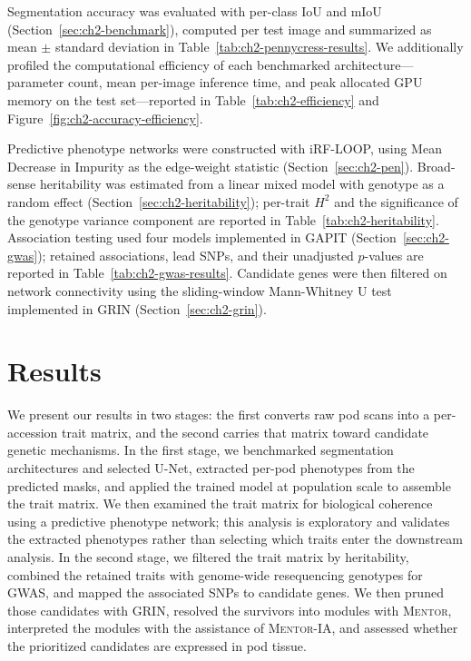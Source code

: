 Segmentation accuracy was evaluated with per-class IoU and mIoU (Section~\ref{sec:ch2-benchmark}), computed per test image and summarized as mean $\pm$ standard deviation in Table~\ref{tab:ch2-pennycress-results}. We additionally profiled the computational efficiency of each benchmarked architecture---parameter count, mean per-image inference time, and peak allocated GPU memory on the test set---reported in Table~\ref{tab:ch2-efficiency} and Figure~\ref{fig:ch2-accuracy-efficiency}.

Predictive phenotype networks were constructed with iRF-LOOP, using Mean Decrease in Impurity as the edge-weight statistic (Section~\ref{sec:ch2-pen}). Broad-sense heritability was estimated from a linear mixed model with genotype as a random effect (Section~\ref{sec:ch2-heritability}); per-trait $H^2$ and the significance of the genotype variance component are reported in Table~\ref{tab:ch2-heritability}. Association testing used four models implemented in GAPIT (Section~\ref{sec:ch2-gwas}); retained associations, lead SNPs, and their unadjusted $p$-values are reported in Table~\ref{tab:ch2-gwas-results}. Candidate genes were then filtered on network connectivity using the sliding-window Mann-Whitney U test implemented in GRIN (Section~\ref{sec:ch2-grin}).

\section{Results}
We present our results in two stages: the first converts raw pod scans into a per-accession trait matrix, and the second carries that matrix toward candidate genetic mechanisms. In the first stage, we benchmarked segmentation architectures and selected U-Net, extracted per-pod phenotypes from the predicted masks, and applied the trained model at population scale to assemble the trait matrix. We then examined the trait matrix for biological coherence using a predictive phenotype network; this analysis is exploratory and validates the extracted phenotypes rather than selecting which traits enter the downstream analysis. In the second stage, we filtered the trait matrix by heritability, combined the retained traits with genome-wide resequencing genotypes for GWAS, and mapped the associated SNPs to candidate genes. We then pruned those candidates with GRIN, resolved the survivors into modules with \textsc{Mentor}, interpreted the modules with the assistance of \textsc{Mentor-IA}, and assessed whether the prioritized candidates are expressed in pod tissue.

